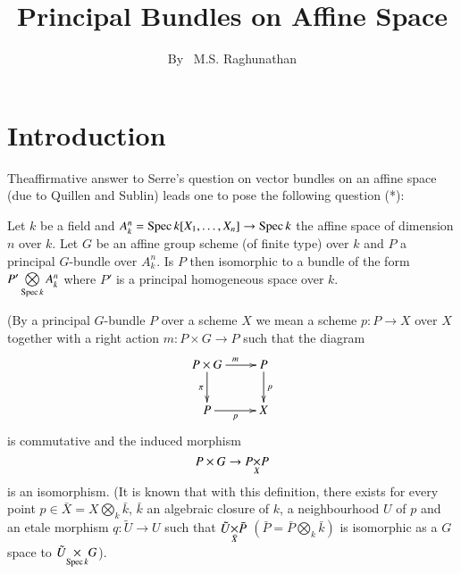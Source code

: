 \title{Principal Bundles on Affine Space}\label{art17}

\author{By~ M.S. Raghunathan}

\date{}
\maketitle

\section{Introduction}\label{art17-sec1}

\setcounter{page}{223}

\setcounter{pageoriginal}{186}
The\pageoriginale affirmative answer to Serre's question on vector bundles  on an affine space (due to Quillen \cite{art17-key10} and Sublin) leads one to pose the following question (*):

Let $k$ be a field and $A^n_k = \operatorname{Spec} k [X_1, \ldots, X_n] \to \operatorname{Spec} k$ the affine space of dimension $n$ over $k$. Let $G$ be an affine group scheme (of finite type) over $k$ and $P$ a principal $G$-bundle over $A^n_k$. Is $P$ then isomorphic to a bundle of the form $P' \bigotimes\limits_{\operatorname{Spec}  k} A^n_k$ where $P'$ is a principal homogeneous space over $k$.

(By a principal $G$-bundle $P$ over a scheme $X$ we mean a scheme $p:P\to X$ over $X$ together with a right action $m: P \times G \to P$ such that the diagram
\[
\xymatrix{
P \times G \ar[r]^m \ar[d]_\pi & P \ar[d]^p\\
P \ar[r]_p & X
}
\]
is commutative and the induced morphism
$$
P\times G \to \fprod{P}{P}{X}
$$
is an isomorphism. (It is known that with this definition, there exists for every point $p \in \bar{X} = X \bigotimes\limits_k \bar{k}$, $\bar{k}$ an algebraic closure of $k$, a neighbourhood $U$ of $p$ and an etale morphism $q: \tilde{U} \to U$ such that $\fprod{\tilde{U}}{\bar{P}}{\bar{X}}$ $(\bar{P} = \bar{P} \bigotimes\limits_{k} \bar{k})$ is isomorphic as a $G$ space to $\fprod{\tilde{U}}{G}{\Spec k}$).

